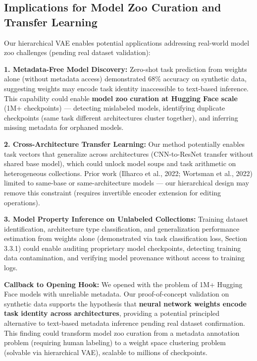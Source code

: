 \subsection{Implications for Model Zoo Curation and Transfer Learning}

Our hierarchical VAE enables potential applications addressing real-world model zoo challenges (pending real dataset validation):

\textbf{1. Metadata-Free Model Discovery:} Zero-shot task prediction from weights alone (without metadata access) demonstrated 68\% accuracy on synthetic data, suggesting weights may encode task identity inaccessible to text-based inference. This capability could enable \textbf{model zoo curation at Hugging Face scale} (1M+ checkpoints) --- detecting mislabeled models, identifying duplicate checkpoints (same task different architectures cluster together), and inferring missing metadata for orphaned models.

\textbf{2. Cross-Architecture Transfer Learning:} Our method potentially enables task vectors that generalize across architectures (CNN-to-ResNet transfer without shared base model), which could unlock model soups and task arithmetic on heterogeneous collections. Prior work (Ilharco et al., 2022; Wortsman et al., 2022) limited to same-base or same-architecture models --- our hierarchical design may remove this constraint (requires invertible encoder extension for editing operations).

\textbf{3. Model Property Inference on Unlabeled Collections:} Training dataset identification, architecture type classification, and generalization performance estimation from weights alone (demonstrated via task classification loss, Section 3.3.1) could enable auditing proprietary model checkpoints, detecting training data contamination, and verifying model provenance without access to training logs.

\textbf{Callback to Opening Hook:} We opened with the problem of 1M+ Hugging Face models with unreliable metadata. Our proof-of-concept validation on synthetic data supports the hypothesis that \textbf{neural network weights encode task identity across architectures}, providing a potential principled alternative to text-based metadata inference pending real dataset confirmation. This finding could transform model zoo curation from a metadata annotation problem (requiring human labeling) to a weight space clustering problem (solvable via hierarchical VAE), scalable to millions of checkpoints.

